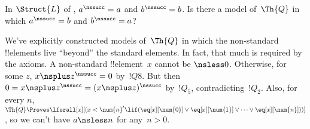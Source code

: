 \documentclass[../../../include/open-logic-section]{subfiles}
\begin{document}
\begin{prob}
In $\Struct{L}$ of , $a^\nssucc
= a$ and $b^\nssucc = b$. Is there a model of~$\Th{Q}$ in which
$a^\nssucc = b$ and $b^\nssucc = a$?
\end{prob}

\begin{explain}
We've explicitly constructed models of~$\Th{Q}$ in which the
non-standard !!{element}s live ``beyond'' the standard elements. In
fact, that much is required by the axioms. A non-standard
!!{element}~$x$ cannot be $\nsless 0$. Otherwise, for some $z$, $x
\nsplus z^\nssucc = 0$ by~$!Q8$. But then $0 = x \nsplus z^\nssucc =
(x \nsplus z)^\nssucc$ by~$!Q_5$, contradicting~$!Q_2$. Also, for
every $n$, $\Th{Q} \Proves \lforall[x][(x < \num{n}' \lif
  (\eq[x][\num{0}] \lor \eq[x][\num{1}] \lor \dots \lor
  \eq[x][\num{n}]))]$, so we can't have $a \nsless n$ for any~$n>0$.
\end{explain}
\end{document}
